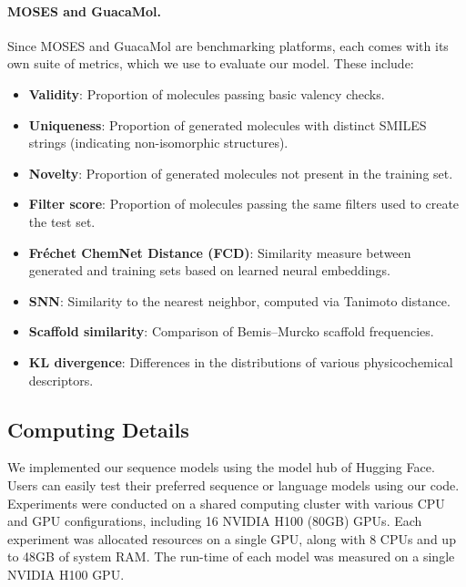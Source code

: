 \paragraph{MOSES and GuacaMol.} Since MOSES \citep{polykovskiy2020moses} and GuacaMol \citep{brown2019guacamol} are benchmarking platforms, each comes with its own suite of metrics, which we use to evaluate our model. These include: 
\begin{itemize} 
\item \textbf{Validity}: Proportion of molecules passing basic valency checks. 
\item \textbf{Uniqueness}: Proportion of generated molecules with distinct SMILES strings (indicating non-isomorphic structures). 
\item \textbf{Novelty}: Proportion of generated molecules not present in the training set. 
\item \textbf{Filter score}: Proportion of molecules passing the same filters used to create the test set. 
\item \textbf{Fréchet ChemNet Distance (FCD)}: Similarity measure between generated and training sets based on learned neural embeddings. 
\item \textbf{SNN}: Similarity to the nearest neighbor, computed via Tanimoto distance. 
\item \textbf{Scaffold similarity}: Comparison of Bemis–Murcko scaffold frequencies. 
\item \textbf{KL divergence}: Differences in the distributions of various physicochemical descriptors. 
\end{itemize}

\subsection{Computing Details}
We implemented our sequence models using the model hub of Hugging Face. Users can easily test their preferred sequence or language models using our code.
Experiments were conducted on a shared computing cluster with various CPU and GPU configurations,
including 16 NVIDIA H100 (80GB) GPUs. Each experiment was allocated
resources on a single GPU, along with 8 CPUs and up to 48GB of system RAM. The run-time of
each model was measured on a single NVIDIA H100 GPU.



